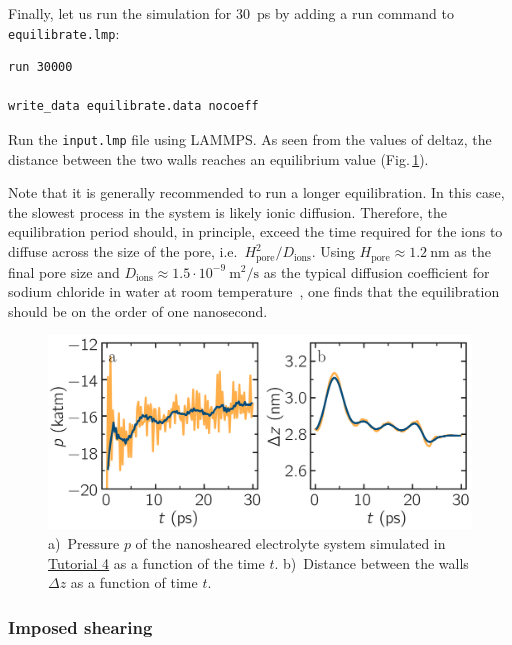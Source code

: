 \documentclass[9pt,tutorial]{livecoms}
\newcommand{\lmpcmd}[1]{\hspace{0pt}\colorbox{listing}{\textcolor{command}{\small{#1}}}\hspace{0pt}} %
\newcommand{\flecmd}[1]{\textcolor{command}{\texttt{#1}}} %
\begin{document}
Finally, let us run the simulation for 30~ps by adding a \lmpcmd{run} command
to \flecmd{equilibrate.lmp}:
\begin{lstlisting}
run 30000

write_data equilibrate.data nocoeff
\end{lstlisting}
Run the \flecmd{input.lmp} file using LAMMPS.  As seen from the values of
\lmpcmd{deltaz}, the distance between the two walls reaches
an equilibrium value (Fig.\,\ref{fig:NANOSHEAR-equilibration}).

\begin{note}
Note that it is generally recommended to run a longer equilibration.  In this case,
the slowest process in the system is likely ionic diffusion.
Therefore, the equilibration period should, in principle, exceed the time required
for the ions to diffuse across the size of the pore, i.e.~$H_\text{pore}^2/D_\text{ions}$.
Using $H_\text{pore} \approx 1.2~\text{nm}$ as the final pore size
and $D_\text{ions} \approx 1.5 \cdot 10^{-9}~\text{m}^2/\text{s}$
as the typical diffusion coefficient for sodium chloride in water at room
temperature~\cite{mills1955remeasurement}, one finds that the equilibration
should be on the order of one nanosecond.
\end{note}

\begin{figure}
\centering
\includegraphics[width=\linewidth]{NANOSHEAR-equilibration}
\caption{a)~Pressure $p$ of the nanosheared electrolyte system
simulated in \hyperref[sheared-confined-label]{Tutorial 4} as a function of the
time $t$.  b)~Distance between the walls $\Delta z$ as a function of time $t$.}
\label{fig:NANOSHEAR-equilibration}
\end{figure}

\subsubsection{Imposed shearing}
\end{document}
